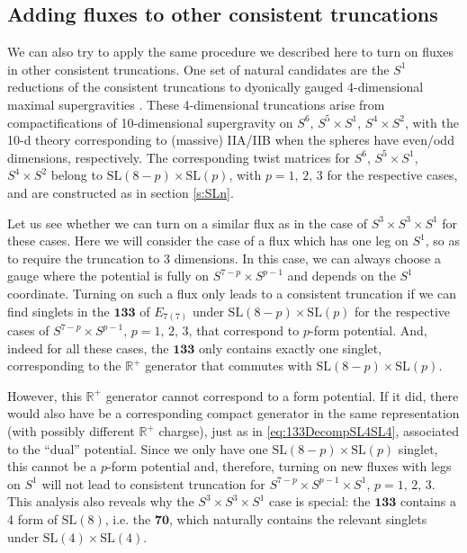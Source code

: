 \documentclass[a4paper, 11pt]{article}
\numberwithin{equation}{section}
\newcommand{\SL}[1]{\mathrm{SL}( #1 )}
\newcommand{\En}[1]{E_{#1(#1)}}
\newcommand{\mbf}[1]{\mathbf{#1}}
\newcommand{\+}{\oplus}
\begin{document}
\subsection{Adding fluxes to other consistent truncations}
We can also try to apply the same procedure we described here to turn on fluxes in other consistent truncations. One set of natural candidates are the $S^1$ reductions of the consistent truncations to dyonically gauged 4-dimensional maximal supergravities \cite{Guarino:2015jca,Inverso:2016eet}. These 4-dimensional truncations arise from compactifications of 10-dimensional supergravity on $S^6$, $S^5\times S^1$, $S^4\times S^2$, with the 10-d theory corresponding to (massive) IIA/IIB when the spheres have even/odd dimensions, respectively. The corresponding twist matrices for $S^6$, $S^5\times S^1$, $S^4\times S^2$ belong to $\SL{8-p} \times \SL{p}$, with $p = 1,\, 2,\, 3$ for the respective cases, and are constructed as in section \ref{s:SLn}.

Let us see whether we can turn on a similar flux as in the case of $S^3 \times S^3 \times S^1$ for these cases. Here we will consider the case of a flux which has one leg on $S^1$, so as to require the truncation to 3 dimensions. In this case, we can always choose a gauge where the potential is fully on $S^{7-p} \times S^{p-1}$ and depends on the $S^1$ coordinate. Turning on such a flux only leads to a consistent truncation if we can find singlets in the $\mbf{133}$ of $\En{7}$ under $\SL{8-p} \times \SL{p}$ for the respective cases of $S^{7-p} \times S^{p-1}$, $p = 1,\, 2,\, 3$, that correspond to $p$-form potential. And, indeed for all these cases, the $\mbf{133}$ only contains exactly one singlet, corresponding to the $\mathbb{R}^+$ generator that commutes with $\SL{8-p} \times \SL{p}$.

However, this $\mathbb{R}^+$ generator cannot correspond to a form potential. If it did, there would also have be a corresponding compact generator in the same representation (with possibly different $\mathbb{R}^+$ chargse), just as in \eqref{eq:133DecompSL4SL4}, associated to the ``dual'' potential. Since we only have one $\SL{8-p} \times \SL{p}$ singlet, this cannot be a $p$-form potential and, therefore, turning on new fluxes with legs on $S^1$ will not lead to consistent truncation for $S^{7-p} \times S^{p-1} \times S^1$, $p = 1,\, 2,\, 3$. This analysis also reveals why the $S^3\times S^3 \times S^1$ case is special: the $\mbf{133}$ contains a 4 form of $\SL{8}$, i.e. the $\mathbf{70}$, which naturally contains the relevant singlets under $\SL{4}\times \SL{4}$.
\end{document}
